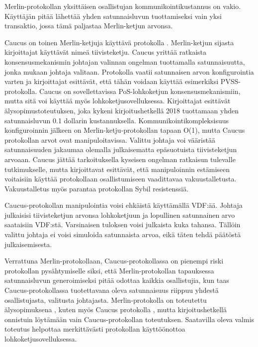 Merlin-protokollan yksittäisen osallistujan kommunikointikustannus on vakio. Käyttäjän pitää lähettää yhden satunnaisluvun tuottamiseksi vain yksi transaktio, jossa tämä paljastaa Merlin-ketjun arvonsa. 

Caucus on toinen Merlin-ketjuja käyttävä protokolla \cite{Caucus}. Merlin-ketjun sijasta kirjoittajat käyttävät nimeä tiivisteketju. Caucus yrittää ratkaista konsensusmekanismin johtajan valinnan ongelman tuottamalla satunnaisuutta, jonka mukaan johtaja valitaan. Protokolla vaatii satunnaisen arvon konfigurointia varten ja kirjoittajat esittävät, että tähän voidaan käyttää esimerkiksi PVSS-protokolla. Caucus on sovellettavissa PoS-lohkoketjun konsensusmekanismiin, mutta sitä voi käyttää myös lohkoketjusovelluksessa. Kirjoittajat esittävät älysopimustoteutuksen, joka kykeni kirjoitushetkellä 2018 tuottamaan yhden satunnaisluvun 0.1 dollarin kustannuksella. Kommunikointikompleksisuus konfiguroinnin jälkeen on Merlin-ketju-protokollan tapaan O(1), mutta Caucus protokollan arvot ovat manipuloitavissa. Valittu johtaja voi vääristää satunnaisuuden jakaumaa olemalla julkaisematta epäsuotuista tiivisteketjun arvoaan. Caucus jättää tarkoituksella kyseisen ongelman ratkaisun tulevalle tutkimukselle, mutta kirjoittavat esittävät, että manipuloinnin estämiseen voitaisiin käyttää protokollaan osallistumiseen vaadittavaa vakuustalletusta. Vakuustalletus myös parantaa protokollan Sybil resistenssiä.

Caucus-protokollan manipulointia voisi ehkäistä käyttämällä VDF:ää. Johtaja julkaisisi tiivisteketjun arvonsa lohkoketjuun ja lopullinen satunnainen arvo saataisiin VDF:stä. Varsinaisen tuloksen voisi julkaista kuka tahansa. Tällöin valittu johtaja ei voisi simuloida satunnaista arvoa, eikä täten tehdä päätöstä julkaisemisesta.

Verrattuna Merlin-protokollaan, Caucus-protokollassa on pienempi riski protokollan pysähtymiselle siksi, että Merlin-protokollan tapauksessa satunnaisluvun generoimiseksi pitää odottaa kaikkia osallistujia, kun taas Caucus-protokollassa tuotettavana oleva satunnaisuus riippuu yhdestä osallistujasta, valitusta johtajasta. Merlin-protokolla on toteutettu älysopimuksena  \cite{MerlinChains}, kuten myös Caucus protokolla \cite{Caucus}, mutta kirjoitushetkellä onnistuin löytämään vain Caucus-protokollan toteutuksen. Saatavilla oleva valmis toteutus helpottaa merkittävästi protokollan käyttöönottoa lohkoketjusovelluksessa.



